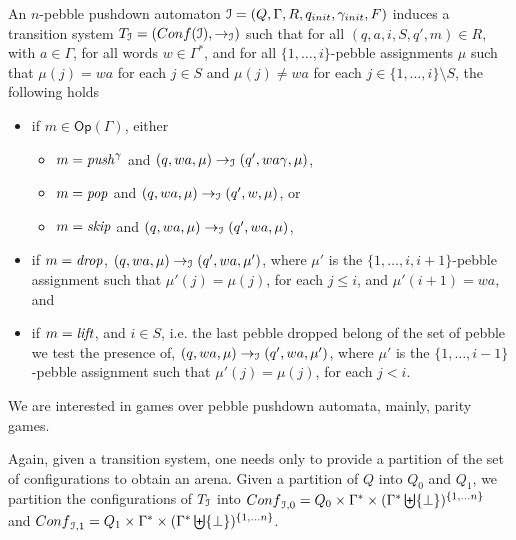 \documentclass[a4paper,UKenglish,cleveref, autoref, thm-restate]{lipics-v2021}
\newcommand{\Conf}{\mathsf{Conf}}
\newcommand{\Op}{\mathsf{Op}}
\begin{document}
\begin{samepage}
An $n$-pebble pushdown automaton $\mathcal{I} =  (Q, \Gamma,  R, q_{init}, {\gamma_{init}} , F)$ induces 
a transition system  $T_{\ppda} = (\Conf(\ppda), \rightarrow_{\ppda})$ 
 such that
for all $(q, a, i, S, q', m) \in R$, with $a \in \Gamma$,
 for all words $w \in  \Gamma^*$, and for all $\{ 1, \ldots , i \}$-pebble assignments $\mu$ such that $\mu(j) = wa$ 
 for each
$j \in S$ 	and
 $\mu(j) \neq wa$ 
 for each $j \in \{ 1, \ldots , i \} \setminus S$,
the following holds
\begin{itemize}
\item if $m \in \Op(\Gamma)$, 
either
\begin{itemize}
\item $ m = \text{\textit{push}}^\gamma$ and $(q,wa,\mu) \rightarrow_{\mathcal{I}} (q',wa\gamma, \mu)$,

\item $ m = \text{\textit{pop}}$ and $(q,wa,\mu) \rightarrow_{\mathcal{I}} (q',w, \mu)$, or

\item $ m = \text{\textit{skip}}$ and $(q,wa,\mu) \rightarrow_{\mathcal{I}} (q',wa, \mu)$,
\end{itemize}
\item if $ m = \text{\textit{drop}}$, 
$(q,wa,\mu) \rightarrow_{\mathcal{I}} (q',wa, \mu')$,  
where $\mu'$ is the $\{ 1, \ldots , i, i+1 \}$-pebble assignment such that
$\mu'(j) = \mu(j)$, for each
$j \leq i$, and $\mu'(i+1) = wa$, and
\item if $m = \text{\textit{lift}}$, and $i \in S$, i.e. the last pebble dropped belong of the set of pebble we test the presence of,
$(q,wa,\mu) \rightarrow_{\mathcal{I}} (q',wa, \mu')$, 
where $\mu'$ is the $\{ 1, \ldots , i - 1 \}$-pebble assignment such that
$\mu'(j) = \mu(j)$, for each
$j < i$.
\end{itemize}
\end{samepage}


\par\noindent\ignorespacesafterend
We are interested in games over pebble pushdown automata, %
mainly, parity games.

Again, given
a 
 transition system, one needs only to provide 
a partition of the set of
configurations 
 to obtain an arena.
Given a partition of
$Q$ into $Q_0$ and $Q_1$, 
we partition the configurations of
$T_{\mathcal{I}}$
into
$\Conf_{\ppda,0}=Q_0\times \Gamma^* \times ( \Gamma^* \biguplus \{ \bot \})^{\{1, \ldots n\}}$
and
$\Conf_{\ppda,1}=Q_1\times  \Gamma^* \times ( \Gamma^* \biguplus \{ \bot \})^{\{1, \ldots n\}}$. 
\end{document}
